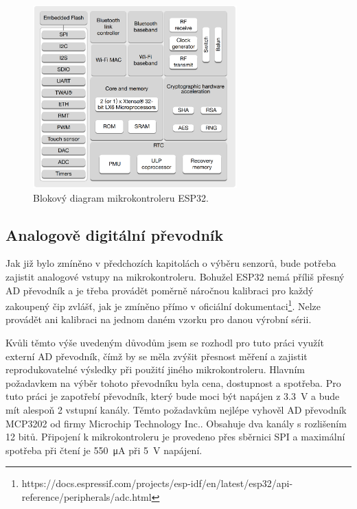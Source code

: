 \begin{figure}
    \centering
    \includegraphics[width=0.7\textwidth]{obrazky/esp32_internalStructure.png}
    \caption{Blokový diagram mikrokontroleru ESP32.\cite{dat_ESP32-WROOM}}
    \label{fig_ESP32InternalStructure}
\end{figure}

\subsection{Analogově digitální převodník}

Jak již bylo zmíněno v předchozích kapitolách o výběru senzorů, bude potřeba zajistit analogové vstupy na mikrokontroleru. Bohužel ESP32 nemá příliš přesný AD převodník a je třeba provádět poměrně náročnou kalibraci pro každý zakoupený čip zvlášť, jak je zmíněno přímo v oficiální dokumentaci\footnote{https://docs.espressif.com/projects/esp-idf/en/latest/esp32/api-reference/peripherals/adc.html}. Nelze provádět ani kalibraci na jednom daném vzorku pro danou výrobní sérii.

Kvůli těmto výše uvedeným důvodům jsem se rozhodl pro tuto práci využít externí AD převodník, čímž by se měla zvýšit přesnost měření a zajistit reprodukovatelné výsledky při použití jiného mikrokontroleru. Hlavním požadavkem na výběr tohoto převodníku byla cena, dostupnost a spotřeba. Pro tuto práci je zapotřebí převodník, který bude moci být napájen z \SI{3,3}{\volt} a bude mít alespoň 2 vstupní kanály. Těmto požadavkům nejlépe vyhověl AD převodník MCP3202 od firmy Microchip Technology Inc.\cite{dat_MCP3202}. Obsahuje dva kanály s rozlišením 12 bitů. Připojení k mikrokontroleru je provedeno přes sběrnici SPI a maximální spotřeba při čtení je \SI{550}{\micro\ampere} při \SI{5}{\volt} napájení.

